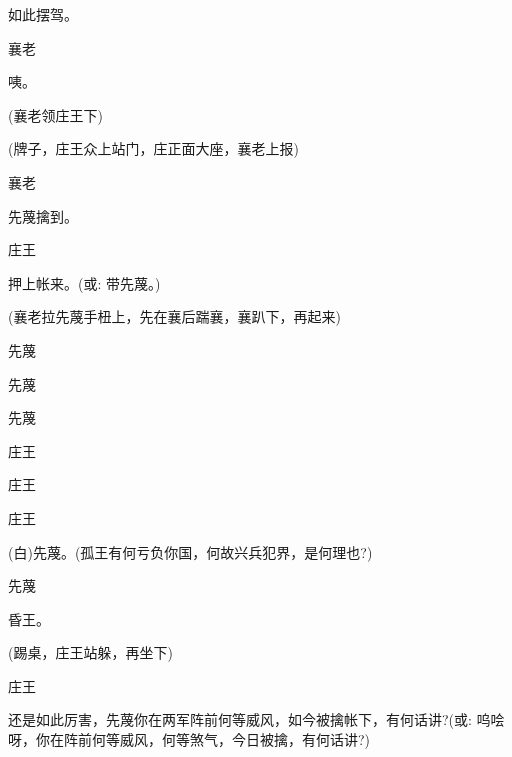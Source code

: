 {如此摆驾。

襄老\hspace{30pt}~

咦。

(襄老领庄王下)

\vspace{5pt}

(牌子，庄王众上站门，庄正面大座，襄老上报)

襄老\hspace{30pt}~

先蔑擒到。

庄王\hspace{30pt}~

押上帐来。({\akai 或}: 带先蔑。)

(襄老拉先蔑手杻上，先在襄后踹襄，襄趴下，再起来)

先蔑\hspace{30pt}~


先蔑


先蔑\hspace{30pt}~


庄王\hspace{30pt}~


庄王


庄王\hspace{30pt}~

(白)先蔑。(孤王有何亏负你国，何故兴兵犯界，是何理也?)

先蔑\hspace{30pt}~

昏王。

(踢桌，庄王站躲，再坐下)

庄王

还是如此厉害，先蔑你在两军阵前何等威风，如今被擒帐下，有何话讲?({\akai 或}: 呜哙呀，你在阵前何等威风，何等煞气，今日被擒，有何话讲?)

}
